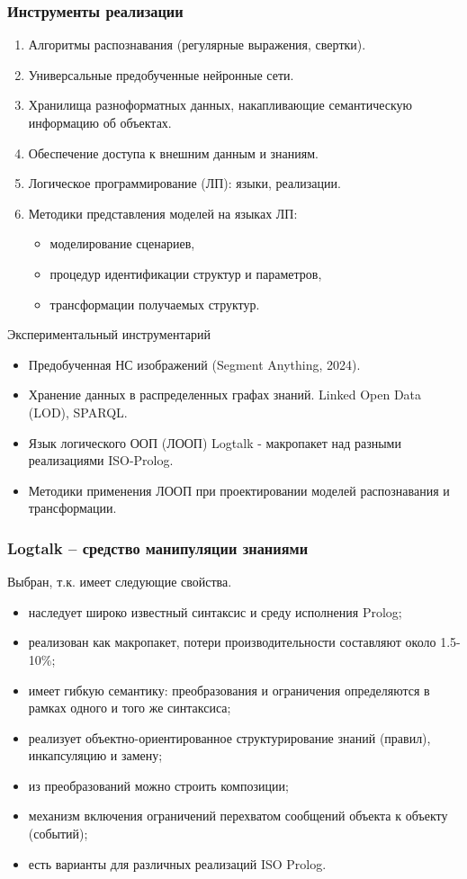 \documentclass[10pt]{beamer}
\begin{document}
\begin{frame}
  \frametitle{Инструменты реализации}
  \begin{enumerate}
  \item Алгоритмы распознавания (регулярные выражения, свертки).
  \item Универсальные предобученные нейронные сети.
  \item Хранилища разноформатных данных, накапливающие семантическую информацию об объектах.
  \item Обеспечение доступа к внешним данным и знаниям.
  \item Логическое программирование (ЛП): языки, реализации.
  \item Методики представления моделей на языках ЛП:
    \begin{itemize}
    \item моделирование сценариев,
    \item процедур идентификации структур и параметров,
    \item трансформации получаемых структур.
    \end{itemize}
  \end{enumerate}
  Экспериментальный инструментарий
  \begin{itemize}
  \item Предобученная НС изображений (Segment Anything, 2024).
  \item Хранение данных в распределенных графах знаний. Linked Open Data (LOD), SPARQL.
  \item Язык логического ООП (ЛООП) Logtalk - макропакет над разными реализациями ISO-Prolog.
    \item Методики применения ЛООП при проектировании моделей распознавания и трансформации.
  \end{itemize}
\end{frame}

\begin{frame}
  \frametitle{Logtalk -- средство манипуляции знаниями}
  Выбран, т.к. имеет следующие свойства.
  \begin{itemize}
  \item наследует широко известный синтаксис и среду исполнения Prolog;
  \item реализован как макропакет, потери производительности составляют около 1.5-10\%;
  \item имеет гибкую семантику: преобразования и ограничения определяются в рамках одного и того же синтаксиса;
  \item реализует объектно-ориентированное структурирование знаний (правил), инкапсуляцию и замену;
  \item из преобразований можно строить композиции;
  \item механизм включения ограничений перехватом сообщений объекта к объекту (событий);
  \item есть варианты для различных реализаций ISO Prolog.
  \end{itemize}
\end{frame}
\end{document}
